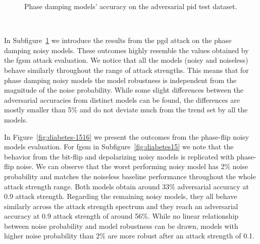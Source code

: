 \begin{figure}[!h]
\begin{subfigure}{0.45\textwidth}
      \label{fig:diabetes14}
  \end{subfigure}
  \caption{Phase damping models' accuracy on the adversarial \ac{pid} test dataset.}
  \label{fig:diabetes-1314}
\end{figure} \

In Subfigure~\ref{fig:diabetes14} we introduce the results from the \ac{pgd}
attack on the phase damping noisy models. These outcomes highly resemble
the values obtained by the \ac{fgsm} attack evaluation. We notice that
all the models (noisy and noiseless) behave similarly throughout the
range of attack strengths. This means that for phase damping noisy models
the model robustness is independent from the magnitude of the noise
probability. While some slight differences between the adversarial
accuracies from distinct models can be found, the differences are
mostly smaller than 5\% and do not deviate much from the trend set
by all the models. \

In Figure~\ref{fig:diabetes-1516} we present the outcomes from the phase-flip
noisy models evaluation. For \ac{fgsm} in Subfigure~\ref{fig:diabetes15}
we note that the behavior from the bit-flip and depolarizing noisy models
is replicated with phase-flip noise. We can observe that the worst
performing noisy model has 2\% noise probability and matches the noiseless
baseline performance throughout the whole attack strength range. Both 
models obtain around 33\% adversarial accuracy at 0.9 attack strength.
Regarding the remaining noisy models, they all behave similarly across
the attack strength spectrum and they reach an adversarial accuracy at
0.9 attack strength of around 56\%. While no linear relationship between noise
probability and model robustness can be drawn, models with higher noise
probability than 2\% are more robust after an attack strength of 0.1. \

